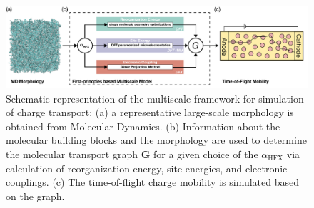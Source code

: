 \documentclass[%
 reprint,
superscriptaddress,
 amsmath,amssymb,
 aps,
prb,
floatfix
]{revtex4-2}
\newcommand{\ahfx}{\ensuremath{\alpha_\text{HFX}}\xspace}
\begin{document}
\begin{figure}[tbp]
  \centering
  \includegraphics[width=\linewidth]{fig1.pdf}
  \caption{Schematic representation of the multiscale framework for simulation of charge transport: (a) a representative large-scale morphology is obtained from Molecular Dynamics. (b) Information about the molecular building blocks and the morphology are used to determine the molecular transport graph $\mathbf{G}$ for a given choice of the \ahfx via calculation of reorganization energy, site energies, and electronic couplings. (c) The time-of-flight charge mobility is simulated based on the graph.}
  \label{fig:MSM}
\end{figure}
\end{document}
